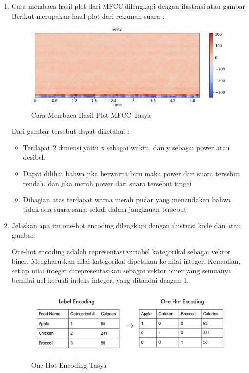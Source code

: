 \begin{enumerate}
\item Cara membaca hasil plot dari MFCC,dilengkapi dengan ilustrasi atau gambar\\
Berikut merupakan hasil plot dari rekaman suara :
\begin{figure}[ht]
\centering
\includegraphics[scale=0.5]{figures/chapter6tasya1.png}
\caption{Cara Membaca Hasil Plot MFCC Tasya}
\label{Teori}
\end{figure}
Dari gambar tersebut dapat diketahui :\\
\begin{itemize}
\item Terdapat 2 dimensi yaitu x sebagai waktu, dan y sebagai power atau desibel.
\item Dapat dilihat bahwa jika berwarna biru maka power dari suara tersebut rendah, dan jika merah power dari suara tersebut tinggi
\item Dibagian atas terdapat warna merah pudar yang menandakan bahwa tidak ada suara sama sekali dalam jangkauan tersebut.
\end{itemize}

\item Jelaskan apa itu one-hot encoding,dilengkapi dengan ilustrasi kode dan atau gambar.
\par One-hot encoding adalah representasi variabel kategorikal sebagai vektor biner. Mengharuskan nilai kategorikal dipetakan ke nilai integer. Kemudian, setiap nilai integer direpresentasikan sebagai vektor biner yang semuanya bernilai nol kecuali indeks integer, yang ditandai dengan 1.
\begin{figure}[ht]
\centering
\includegraphics[scale=0.5]{figures/chapter6tasya3.png}
\caption{One Hot Encoding Tasya}
\label{Teori}
\end{figure}


\end{enumerate}
